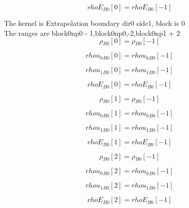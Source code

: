\documentclass{article}
\begin{document}
\begin{dmath}{rhoE{_{B0}}}[{0}] = {rhoE{_{B0}}}[{-1}]\end{dmath}

\noindent The kernel is Extrapolation boundary dir0 side1, block is 0\\\noindent The ranges are block0np0 - 1,block0np0,-2,block0np1 + 2\\\begin{dmath}{\rho{_{B0}}}[{0}] = {\rho{_{B0}}}[{-1}]\end{dmath}

\begin{dmath}{rhou_{0}{_{B0}}}[{0}] = {rhou_{0}{_{B0}}}[{-1}]\end{dmath}

\begin{dmath}{rhou_{1}{_{B0}}}[{0}] = {rhou_{1}{_{B0}}}[{-1}]\end{dmath}

\begin{dmath}{rhoE{_{B0}}}[{0}] = {rhoE{_{B0}}}[{-1}]\end{dmath}

\begin{dmath}{\rho{_{B0}}}[{1}] = {\rho{_{B0}}}[{-1}]\end{dmath}

\begin{dmath}{rhou_{0}{_{B0}}}[{1}] = {rhou_{0}{_{B0}}}[{-1}]\end{dmath}

\begin{dmath}{rhou_{1}{_{B0}}}[{1}] = {rhou_{1}{_{B0}}}[{-1}]\end{dmath}

\begin{dmath}{rhoE{_{B0}}}[{1}] = {rhoE{_{B0}}}[{-1}]\end{dmath}

\begin{dmath}{\rho{_{B0}}}[{2}] = {\rho{_{B0}}}[{-1}]\end{dmath}

\begin{dmath}{rhou_{0}{_{B0}}}[{2}] = {rhou_{0}{_{B0}}}[{-1}]\end{dmath}

\begin{dmath}{rhou_{1}{_{B0}}}[{2}] = {rhou_{1}{_{B0}}}[{-1}]\end{dmath}

\begin{dmath}{rhoE{_{B0}}}[{2}] = {rhoE{_{B0}}}[{-1}]\end{dmath}
\end{document}
